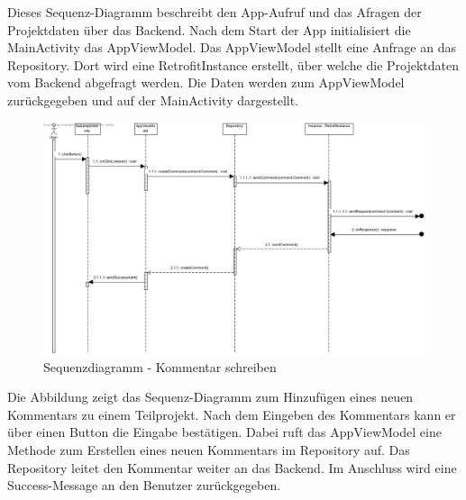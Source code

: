 Dieses Sequenz-Diagramm beschreibt den App-Aufruf und das Afragen der Projektdaten über das Backend. Nach dem Start der App initialisiert die MainActivity das AppViewModel. Das AppViewModel stellt eine Anfrage an das Repository. Dort wird eine RetrofitInstance erstellt, über welche die Projektdaten vom Backend abgefragt werden. Die Daten werden zum AppViewModel zurückgegeben und auf der MainActivity dargestellt.


\begin{figure}[H]
	\centering
	\includegraphics[width=\textwidth]{img/seqappcreate}		
	\caption{Sequenzdiagramm - Kommentar schreiben}
	\label{fig:sequenz-d}
\end{figure}

Die Abbildung zeigt das Sequenz-Diagramm zum Hinzufügen eines neuen Kommentars zu einem Teilprojekt. Nach dem Eingeben des Kommentars kann er über einen Button die Eingabe bestätigen. Dabei ruft das AppViewModel eine Methode zum Erstellen eines neuen Kommentars im Repository auf. Das Repository leitet den Kommentar weiter an das Backend. Im Anschluss wird eine Success-Message an den Benutzer zurückgegeben. 
